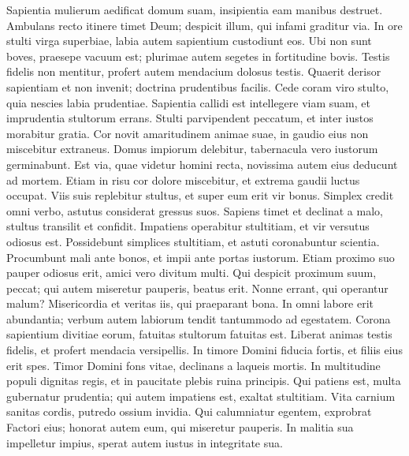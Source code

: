 \begin{biblechapter}
\begin{biblechapter}
\begin{biblechapter}
\begin{biblechapter}
\begin{biblechapter}
\begin{biblechapter}
\begin{biblechapter}
\begin{biblechapter}
\begin{biblechapter}
\begin{biblechapter}
\begin{biblechapter}
\begin{biblechapter}
\begin{biblechapter}
\begin{biblechapter}
 \verse Sapientia mulierum aedificat domum suam,
 insipientia eam manibus destruet.
 \verse Ambulans recto itinere timet Deum;
 despicit illum, qui infami graditur via.
 \verse In ore stulti virga superbiae,
 labia autem sapientium custodiunt eos.
 \verse Ubi non sunt boves, praesepe vacuum est;
 plurimae autem segetes in fortitudine bovis.
 \verse Testis fidelis non mentitur,
 profert autem mendacium dolosus testis.
 \verse Quaerit derisor sapientiam et non invenit;
 doctrina prudentibus facilis.
 \verse Cede coram viro stulto,
 quia nescies labia prudentiae.
 \verse Sapientia callidi est intellegere viam suam,
 et imprudentia stultorum errans.
 \verse Stulti parvipendent peccatum,
 et inter iustos morabitur gratia.
 \verse Cor novit amaritudinem animae suae,
 in gaudio eius non miscebitur extraneus.
 \verse Domus impiorum delebitur,
 tabernacula vero iustorum germinabunt.
 \verse Est via, quae videtur homini recta,
 novissima autem eius deducunt ad mortem.
 \verse Etiam in risu cor dolore miscebitur,
 et extrema gaudii luctus occupat.
 \verse Viis suis replebitur stultus,
 et super eum erit vir bonus.
 \verse Simplex credit omni verbo,
 astutus considerat gressus suos.
 \verse Sapiens timet et declinat a malo,
 stultus transilit et confidit.
 \verse Impatiens operabitur stultitiam,
 et vir versutus odiosus est.
 \verse Possidebunt simplices stultitiam,
 et astuti coronabuntur scientia.
 \verse Procumbunt mali ante bonos,
 et impii ante portas iustorum.
 \verse Etiam proximo suo pauper odiosus erit,
 amici vero divitum multi.
 \verse Qui despicit proximum suum, peccat;
 qui autem miseretur pauperis, beatus erit.
 \verse Nonne errant, qui operantur malum?
 Misericordia et veritas iis, qui praeparant bona.
 \verse In omni labore erit abundantia;
 verbum autem labiorum tendit tantummodo ad egestatem.
 \verse Corona sapientium divitiae eorum,
 fatuitas stultorum fatuitas est.
 \verse Liberat animas testis fidelis,
 et profert mendacia versipellis.
 \verse In timore Domini fiducia fortis,
 et filiis eius erit spes.
 \verse Timor Domini fons vitae,
 declinans a laqueis mortis.
 \verse In multitudine populi dignitas regis,
 et in paucitate plebis ruina principis.
 \verse Qui patiens est, multa gubernatur prudentia;
 qui autem impatiens est, exaltat stultitiam.
 \verse Vita carnium sanitas cordis,
 putredo ossium invidia.
 \verse Qui calumniatur egentem, exprobrat Factori eius;
 honorat autem eum, qui miseretur pauperis.
 \verse In malitia sua impelletur impius,
 sperat autem iustus in integritate sua.

\end{biblechapter}
\end{biblechapter}
\end{biblechapter}
\end{biblechapter}
\end{biblechapter}
\end{biblechapter}
\end{biblechapter}
\end{biblechapter}
\end{biblechapter}
\end{biblechapter}
\end{biblechapter}
\end{biblechapter}
\end{biblechapter}
\end{biblechapter}
